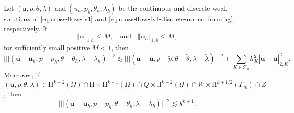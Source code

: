 \documentclass[onefignum,onetabnum,reqno,a4paper,final]{siamart250211}
\newcommand\bu{\boldsymbol{u}}
\newcommand\0{\mathbf{0}}
\def\CT{{\mathcal T}}
\renewcommand\H{\mathrm{H}}
\newcommand\bH{\boldsymbol{\mathrm{H}}}
\newcommand{\triplenorm}[1]{\lvert\!\lvert\!\lvert #1
  \rvert\!\rvert\!\rvert}
\numberwithin{figure}{section}
\numberwithin{table}{section}
\begin{document}
    \begin{theorem}
     Let $(\bu,p,\theta,\lambda)$ and $(u_h,p_h,\theta_h, \lambda_h)$ be the continuous and discrete weak solutions of \eqref{eq:cross-flow-fv1} and \eqref{eq:cross-flow-fv1-discrete-nonconforming}, respectively. If 
     \[\Vert\bu\Vert_{1,h}\le M,\quad\mbox{and}\quad \Vert\bu_h\Vert_{1,h}\le M,\]
     for sufficiently small positive $M<1$, then
     \[\triplenorm{(\bu-\bu_h,p-p_h,\theta-\theta_h,\lambda-\lambda_h)}^2\lesssim \triplenorm{(\bu-\tilde{\bu},p-\tilde{p},\theta-\tilde{\theta},\lambda-\tilde{\lambda})}^2+\sum_{K\in\CT_h}h_K^2|\bu-\tilde{\bu}|_{2,K}^2.\]
     Moreover, if $(\bu,p,\theta,\lambda)\in \bH^{k+2}(\Omega)\cap \bH\times \H^{k+1}(\Omega)\cap Q\times \H^{k+2}(\Omega)\cap W \times \H^{k+1/2}(\Gamma_m)\cap Z$, then 
     $$
     \triplenorm{(\bu-\bu_h,p-p_h,\theta-\theta_h,\lambda-\lambda_h)}^2\lesssim h^{k+1}.    
     $$
    \end{theorem}
\end{document}
